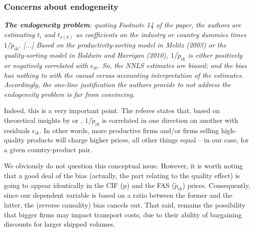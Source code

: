 \documentclass[a4paper,11pt]{article}
\begin{document}



\subsubsection{Concerns about endogeneity}

\textit{\textbf{The endogeneity problem}: quoting Footnote 14 of the paper, the authors
are estimating $t_i$ and $t_{s(k)}$ as coefficients on the industry or country
dummies times $1/\widetilde{p}_{ik}$. [...] Based on the productivity-sorting model in Melitz (2003) or the quality-sorting
model in Baldwin and Harrigan (2010),  $1/\widetilde{p}_{ik}$ is either positively
or negatively correlated with $\epsilon_{ik}$. So, the NNLS estimates are biased; and
the bias has nothing to with the casual versus accounting interpretation of
the estimates. Accordingly, the one-line justification the authors provide
to not address the endogeneity problem is far from convincing.}

Indeed, this is a very important point. The referee states that, based on theoretical insights by \citet{melitz} or \citet{baldwin_harrigan}, $1/\widetilde{p}_{ik}$ is correlated in one direction on another with residuals $\epsilon_{ik}$. In other words, more productive firms and/or firms selling high-quality products will charge higher prices, all other things equal – in our case, for a given country-product pair.

We obviously do not question this conceptual issue. However, it is worth noting that a good deal of the bias (actually, the part relating to the quality effect) is going to appear identically in the CIF (p) and the FAS ($\widetilde{p}_{ik}$) prices. Consequently, since our dependent variable is based on a ratio between the former and the latter, the (reverse causality) bias cancels out. That said, remains the possibility that bigger firms may impact transport costs, due to their ability of bargaining discounts for larger shipped volumes.
\end{document}
